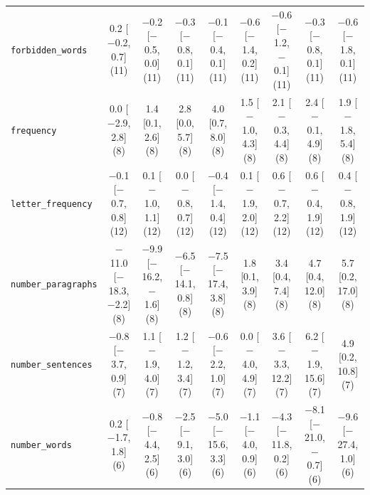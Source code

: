 \documentclass{article}
\begin{document}
\begin{table}[h]
{\begin{tabular}{lcccccccc}
\texttt{forbidden\_words} & 0.2 [$-$0.2, 0.7] (11) & $-$0.2 [$-$0.5, 0.0] (11) & $-$0.3 [$-$0.8, 0.1] (11) & $-$0.1 [$-$0.4, 0.1] (11) & $-$0.6 [$-$1.4, 0.2] (11) & $-$0.6 [$-$1.2, $-$0.1] (11) & $-$0.3 [$-$0.8, 0.1] (11) & $-$0.6 [$-$1.8, 0.1] (11) \\
\texttt{frequency} & 0.0 [$-$2.9, 2.8] (8) & 1.4 [0.1, 2.6] (8) & 2.8 [0.0, 5.7] (8) & 4.0 [0.7, 8.0] (8) & 1.5 [$-$1.0, 4.3] (8) & 2.1 [$-$0.3, 4.4] (8) & 2.4 [$-$0.1, 4.9] (8) & 1.9 [$-$1.8, 5.4] (8) \\
\texttt{letter\_frequency} & $-$0.1 [$-$0.7, 0.8] (12) & 0.1 [$-$1.0, 1.1] (12) & 0.0 [$-$0.8, 0.7] (12) & $-$0.4 [$-$1.4, 0.4] (12) & 0.1 [$-$1.9, 2.0] (12) & 0.6 [$-$0.7, 2.2] (12) & 0.6 [$-$0.4, 1.9] (12) & 0.4 [$-$0.8, 1.9] (12) \\
\texttt{number\_paragraphs} & $-$11.0 [$-$18.3, $-$2.2] (8) & $-$9.9 [$-$16.2, $-$1.6] (8) & $-$6.5 [$-$14.1, 0.8] (8) & $-$7.5 [$-$17.4, 3.8] (8) & 1.8 [0.1, 3.9] (8) & 3.4 [0.4, 7.4] (8) & 4.7 [0.4, 12.0] (8) & 5.7 [0.2, 17.0] (8) \\
\texttt{number\_sentences} & $-$0.8 [$-$3.7, 0.9] (7) & 1.1 [$-$1.9, 4.0] (7) & 1.2 [$-$1.2, 3.4] (7) & $-$0.6 [$-$2.2, 1.0] (7) & 0.0 [$-$4.0, 4.9] (7) & 3.6 [$-$3.3, 12.2] (7) & 6.2 [$-$1.9, 15.6] (7) & 4.9 [0.2, 10.8] (7) \\
\texttt{number\_words} & 0.2 [$-$1.7, 1.8] (6) & $-$0.8 [$-$4.4, 2.5] (6) & $-$2.5 [$-$9.1, 3.0] (6) & $-$5.0 [$-$15.6, 3.3] (6) & $-$1.1 [$-$4.0, 0.9] (6) & $-$4.3 [$-$11.8, 0.2] (6) & $-$8.1 [$-$21.0, $-$0.7] (6) & $-$9.6 [$-$27.4, 1.0] (6) \\
\bottomrule
\end{tabular}
}
\end{table}
\end{document}
